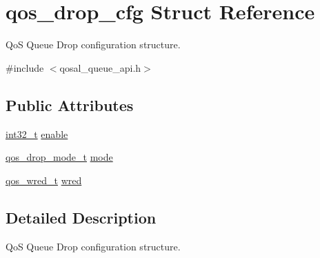 \hypertarget{structqos__drop__cfg}{\section{qos\-\_\-drop\-\_\-cfg Struct Reference}
\label{structqos__drop__cfg}
}


Qo\-S Queue Drop configuration structure.  




{\ttfamily \#include $<$qosal\-\_\-queue\-\_\-api.\-h$>$}

\subsection*{Public Attributes}
\begin{DoxyCompactItemize}
\item 
\hyperlink{commondefs_8h_a32f2e37ee053cf2ce8ca28d1f74630e5}{int32\-\_\-t} \hyperlink{structqos__drop__cfg_a340f96cb4ea99e2bd2b0e07c56d0d174}{enable}
\item 
\hyperlink{group__FAPI__QOS__QUEUE_gac3dd371b02e4e2ff5023eaa49dfd7aab}{qos\-\_\-drop\-\_\-mode\-\_\-t} \hyperlink{structqos__drop__cfg_aaebe1a62494df9083589c0d339f8e96b}{mode}
\item 
\hyperlink{group__FAPI__QOS__QUEUE_ga42b4d8fefa10f2b563d6151e772c6b3c}{qos\-\_\-wred\-\_\-t} \hyperlink{structqos__drop__cfg_a9db647852861e7763da396270d1e1232}{wred}
\end{DoxyCompactItemize}


\subsection{Detailed Description}
Qo\-S Queue Drop configuration structure. 

